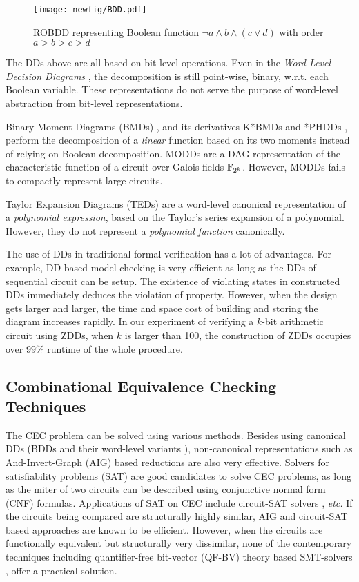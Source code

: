 \begin{figure}[h]
\centerline{
\texttt{[image: newfig/BDD.pdf]}
}
\caption{ROBDD representing Boolean function $\neg a \land b \land (c\lor d)$ with order $a>b>c>d$}
\label{fig:BDD}
\end{figure}

The DDs above are all based on bit-level operations. Even in the {\it Word-Level Decision Diagrams}
\cite{WLS}, the decomposition is still point-wise, binary, 
w.r.t. each Boolean variable. These representations do not
serve the purpose of word-level abstraction from bit-level
representations. 

Binary Moment Diagrams (BMDs) \cite{bmd}, and its derivatives K*BMDs
\cite{kbmd} and *PHDDs \cite{phdd}, perform the decomposition of a {\it linear} function
based on its two moments instead of relying on Boolean decomposition. 
MODDs \cite{modd,modd_tcomp} are a DAG representation of the
characteristic function of a circuit over Galois fields ${\mathbb{F}}_{2^k}$. 
However, MODDs fails to compactly represent large circuits.


Taylor Expansion Diagrams (TEDs) \cite{ted_tcomp} are a
word-level canonical representation of a {\it polynomial expression},
based on the Taylor's series expansion of a polynomial. However, they do
not represent a {\it polynomial function} canonically. 

The use of DDs in traditional formal verification has a lot of advantages. 
For example, DD-based model checking is very efficient as long as the DDs of sequential 
circuit can be setup. The existence of violating states in constructed DDs 
immediately deduces the violation of property. However, when the design gets
larger and larger, the time and space cost of building and storing the diagram 
increases rapidly. In our experiment of verifying a $k$-bit arithmetic circuit 
using ZDDs, when $k$ is larger than 100, the construction of ZDDs occupies 
over $99\%$ runtime of the whole procedure.
\subsection{Combinational Equivalence Checking Techniques}
The CEC problem can be solved using various methods.
Besides using canonical DDs (BDDs
\cite{BRYA86} and their word-level variants \cite{WLS}),
non-canonical representations such as And-Invert-Graph (AIG) based reductions 
\cite{AIG:2002,alanmi:cec:iccad2006} are also very effective. 
Solvers for satisfiability problems (SAT) are good candidates to solve CEC problems,
as long as the miter of two circuits can be described using conjunctive normal form (CNF)
formulas. Applications of SAT on CEC include circuit-SAT solvers \cite{csat}, {\it etc.}
If the circuits being compared are structurally highly similar, AIG and circuit-SAT 
based approaches are known to be efficient.
However, when the circuits are functionally equivalent but structurally very dissimilar, none of the 
  contemporary techniques including quantifier-free bit-vector 
  (QF-BV) theory based SMT-solvers \cite{Cryptol:fmcad09},
  offer a practical solution.    


